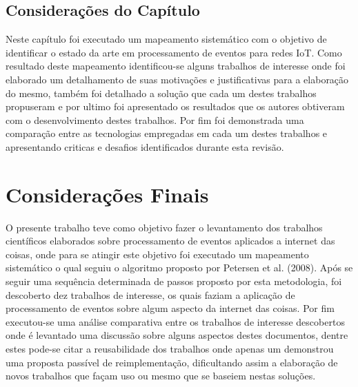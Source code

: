 \documentclass[ti,table]{texufpel} %
\begin{document}
\section{Considerações do Capítulo}

Neste capítulo foi executado um mapeamento sistemático com o objetivo de  identificar o estado da arte em processamento de eventos para redes IoT. Como resultado deste mapeamento identificou-se alguns trabalhos de interesse onde foi elaborado um detalhamento de suas motivações e justificativas para a elaboração do mesmo, também foi detalhado a solução que cada um destes trabalhos propuseram e por ultimo foi apresentado os resultados que os autores obtiveram com o desenvolvimento destes trabalhos. Por fim foi demonstrada uma comparação entre as tecnologias empregadas em cada um destes trabalhos e apresentando criticas e desafios identificados durante esta revisão. 


\chapter{Considerações Finais}
\label{cap:Consideracoes_Finais}

O presente trabalho teve como objetivo fazer o levantamento dos trabalhos científicos elaborados sobre processamento de eventos aplicados a internet das coisas, onde para se atingir este objetivo foi executado um mapeamento sistemático o qual seguiu o algoritmo proposto por Petersen et al. (2008). Após se seguir uma sequência determinada de passos proposto por esta metodologia, foi descoberto dez trabalhos de interesse, os quais faziam a aplicação de processamento de eventos sobre algum aspecto da internet das coisas. Por fim executou-se uma análise comparativa entre os trabalhos de interesse descobertos onde é levantado uma discussão sobre alguns aspectos destes documentos, dentre estes pode-se citar a reusabilidade dos trabalhos onde apenas um demonstrou uma proposta passível de reimplementação, dificultando assim a elaboração de novos trabalhos que façam uso ou mesmo que se baseiem nestas soluções.





\end{document}
